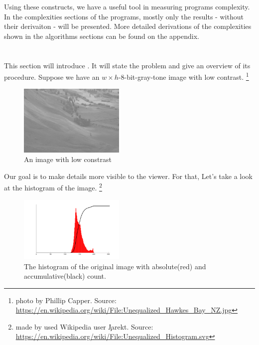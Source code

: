   Using these constructs, we have a useful tool in measuring
  programs complexity. In the complexities sections of
  the programs, mostly only the results - without their derivaiton -
  will be presented. More detailed derivations of the complexities shown
  in the algorithms sections can be found
  on the appendix.
   
\section{\algo}
  \label{section:hbalanceintro}
  This section will introduce \algo. It will state the problem and give
  an overview of its procedure.
  Suppose we have an $w \times h$-8-bit-gray-tone image with low contrast.
  \footnote{photo by Phillip Capper. Source: \url{https://en.wikipedia.org/wiki/File:Unequalized_Hawkes_Bay_NZ.jpg}}
      
      \begin{figure}[h]
        \centering
        \includegraphics[width=0.45\textwidth]{img-org}
        \caption{An image with low constrast}
        \label{fig:img-org}
      \end{figure}
      Our goal is to make details more visible to the viewer. For that,
      Let's take a look at the histogram of the image.
      \footnote{made by used Wikipedia user \c{Jarekt}. Source: \url{https://en.wikipedia.org/wiki/File:Unequalized_Histogram.svg}}
      
      \begin{figure}[h]
        \centering
        \includegraphics[width=0.45\textwidth]{hist-org}
        \caption{The histogram of the original image with absolute(red) and accumulative(black) count.}
        \label{fig:hist-org}
      \end{figure}
      
